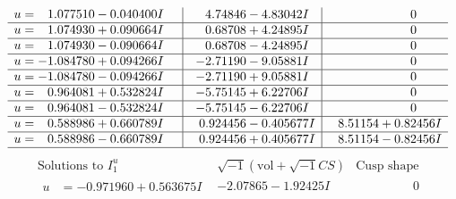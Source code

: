 \documentclass[1p]{elsarticle_modified}
\theoremstyle{definition}
\newcommand{\I}{\sqrt{-1}}
\begin{document}
$$\begin{array}{c|c|c}
\begin{aligned}
u &= \phantom{-}1.077510 - 0.040400 I\end{aligned}
 & \phantom{-}4.74846 - 4.83042 I & \phantom{-0.000000 } 0 \\ \hline\begin{aligned}
u &= \phantom{-}1.074930 + 0.090664 I\end{aligned}
 & \phantom{-}0.68708 + 4.24895 I & \phantom{-0.000000 } 0 \\ \hline\begin{aligned}
u &= \phantom{-}1.074930 - 0.090664 I\end{aligned}
 & \phantom{-}0.68708 - 4.24895 I & \phantom{-0.000000 } 0 \\ \hline\begin{aligned}
u &= -1.084780 + 0.094266 I\end{aligned}
 & -2.71190 - 9.05881 I & \phantom{-0.000000 } 0 \\ \hline\begin{aligned}
u &= -1.084780 - 0.094266 I\end{aligned}
 & -2.71190 + 9.05881 I & \phantom{-0.000000 } 0 \\ \hline\begin{aligned}
u &= \phantom{-}0.964081 + 0.532824 I\end{aligned}
 & -5.75145 + 6.22706 I & \phantom{-0.000000 } 0 \\ \hline\begin{aligned}
u &= \phantom{-}0.964081 - 0.532824 I\end{aligned}
 & -5.75145 - 6.22706 I & \phantom{-0.000000 } 0 \\ \hline\begin{aligned}
u &= \phantom{-}0.588986 + 0.660789 I\end{aligned}
 & \phantom{-}0.924456 - 0.405677 I & \phantom{-}8.51154 + 0.82456 I \\ \hline\begin{aligned}
u &= \phantom{-}0.588986 - 0.660789 I\end{aligned}
 & \phantom{-}0.924456 + 0.405677 I & \phantom{-}8.51154 - 0.82456 I\\
 \hline 
 \end{array}$$\newpage$$\begin{array}{c|c|c}  
\text{Solutions to }I^u_{1}& \I (\text{vol} + \sqrt{-1}CS) & \text{Cusp shape}\\
 \hline 
\begin{aligned}
u &= -0.971960 + 0.563675 I\end{aligned}
 & -2.07865 - 1.92425 I & \phantom{-0.000000 } 0 \\ \hline\begin{aligned}

\end{aligned}
\end{array}$$
\end{document}
